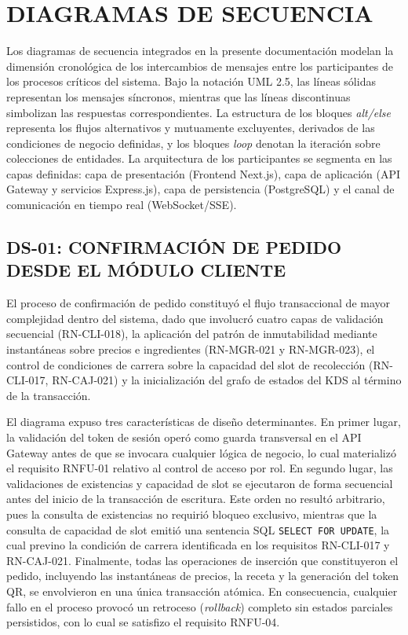 \endgroup

\newpage
\section{DIAGRAMAS DE SECUENCIA}
Los diagramas de secuencia integrados en la presente documentación modelan la dimensión cronológica de los intercambios de mensajes entre los participantes de los procesos críticos del sistema. Bajo la notación UML 2.5, las líneas sólidas representan los mensajes síncronos, mientras que las líneas discontinuas simbolizan las respuestas correspondientes. La estructura de los bloques \textit{alt/else} representa los flujos alternativos y mutuamente excluyentes, derivados de las condiciones de negocio definidas, y los bloques \textit{loop} denotan la iteración sobre colecciones de entidades. La arquitectura de los participantes se segmenta en las capas definidas: capa de presentación (Frontend Next.js), capa de aplicación (API Gateway y servicios Express.js), capa de persistencia (PostgreSQL) y el canal de comunicación en tiempo real (WebSocket/SSE).

\subsection{DS-01: CONFIRMACIÓN DE PEDIDO DESDE EL MÓDULO CLIENTE}
El proceso de confirmación de pedido constituyó el flujo transaccional de mayor complejidad dentro del sistema, dado que involucró cuatro capas de validación secuencial (RN-CLI-018), la aplicación del patrón de inmutabilidad mediante instantáneas sobre precios e ingredientes (RN-MGR-021 y RN-MGR-023), el control de condiciones de carrera sobre la capacidad del slot de recolección (RN-CLI-017, RN-CAJ-021) y la inicialización del grafo de estados del KDS al término de la transacción.

El diagrama expuso tres características de diseño determinantes. En primer lugar, la validación del token de sesión operó como guarda transversal en el API Gateway antes de que se invocara cualquier lógica de negocio, lo cual materializó el requisito RNFU-01 relativo al control de acceso por rol. En segundo lugar, las validaciones de existencias y capacidad de slot se ejecutaron de forma secuencial antes del inicio de la transacción de escritura. Este orden no resultó arbitrario, pues la consulta de existencias no requirió bloqueo exclusivo, mientras que la consulta de capacidad de slot emitió una sentencia SQL \texttt{SELECT FOR UPDATE}, la cual previno la condición de carrera identificada en los requisitos RN-CLI-017 y RN-CAJ-021. Finalmente, todas las operaciones de inserción que constituyeron el pedido, incluyendo las instantáneas de precios, la receta y la generación del token QR, se envolvieron en una única transacción atómica. En consecuencia, cualquier fallo en el proceso provocó un retroceso (\textit{rollback}) completo sin estados parciales persistidos, con lo cual se satisfizo el requisito RNFU-04.

